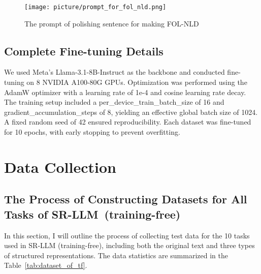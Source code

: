 \begin{figure}[ht]
\centering
\vspace{0in}
\texttt{[image: picture/prompt\_for\_fol\_nld.png]}
\caption{The prompt of polishing sentence for making FOL-NLD}
\label{fig:folnld_prompt}
\vspace{-0.1in}
\end{figure}

\subsection{Complete Fine-tuning Details}
\label{app:ftd}
We used Meta's Llama-3.1-8B-Instruct as the backbone and conducted fine-tuning on 8 NVIDIA A100-80G GPUs. Optimization was performed using the AdamW optimizer with a learning rate of 1e-4 and cosine learning rate decay. The training setup included a per\_device\_train\_batch\_size of 16 and gradient\_accumulation\_steps of 8, yielding an effective global batch size of 1024. A fixed random seed of 42 ensured reproducibility. Each dataset was fine-tuned for 10 epochs, with early stopping to prevent overfitting.

\section{Data Collection}
\subsection{The Process of Constructing Datasets for All Tasks of SR-LLM~(training-free)}
\label{app:dataset_tf}
In this section, I will outline the process of collecting test data for the 10 tasks used in SR-LLM (training-free), including both the original text and three types of structured representations. The data statistics are summarized in the Table~\ref{tab:dataset_of_tf}.

